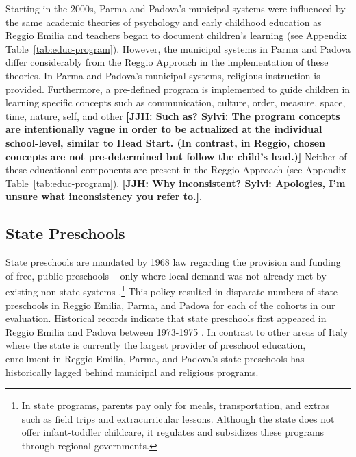 Starting in the 2000s, Parma and Padova's municipal systems were influenced by the same academic theories of psychology and early childhood education as Reggio Emilia and teachers began to document children's learning (see Appendix Table~\ref{tab:educ-program}). However, the municipal systems in Parma and Padova differ considerably from the Reggio Approach in the implementation of these theories. In Parma and Padova's municipal systems, religious instruction is provided. Furthermore, a pre-defined program is implemented to guide children in learning specific concepts such as communication, culture, order, measure, space, time, nature, self, and other \textbf{[JJH: Such as? Sylvi: The program concepts are intentionally vague in order to be actualized at the individual school-level, similar to Head Start. (In contrast, in Reggio, chosen concepts are not pre-determined but follow the child's lead.)]} Neither of these educational components are present in the Reggio Approach (see Appendix Table~\ref{tab:educ-program}).  \textbf{[JJH: Why inconsistent? Sylvi: Apologies, I'm unsure what inconsistency you refer to.]}. 

\subsection{State Preschools}

State preschools are mandated by 1968 law regarding the provision and funding of free, public preschools -- only where local demand was not already met by existing non-state systems \citep{Hohnerlein_2009_Paradox-Public-Preschools}.\footnote{In state programs, parents pay only for meals, transportation, and extras such as field trips and extracurricular lessons. Although the state does not offer infant-toddler childcare, it regulates and subsidizes these programs through regional governments.} This policy resulted in disparate numbers of state preschools in Reggio Emilia, Parma, and Padova for each of the cohorts in our evaluation. Historical records indicate that state preschools first appeared in Reggio Emilia and Padova between 1973-1975 \citep{Padova-Admin-Data_1964-2011,Reggio-Admin-data_1966-2006,Reggio-Annual-Journals_1994-2011}. In contrast to other areas of Italy where the state is currently the largest provider of preschool education, enrollment in Reggio Emilia, Parma, and Padova's state preschools has historically lagged behind municipal and religious programs.

